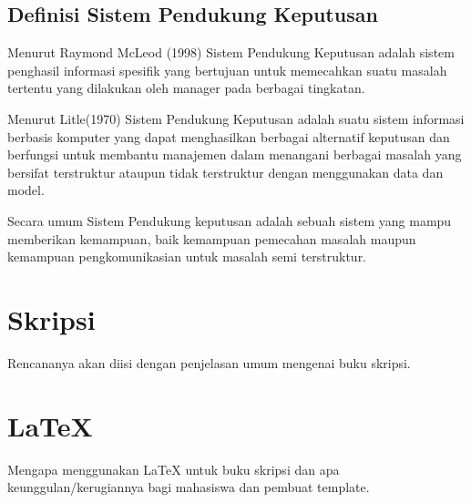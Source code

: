 \subsection{Definisi Sistem Pendukung Keputusan} 
Menurut Raymond McLeod (1998) Sistem Pendukung Keputusan adalah sistem penghasil informasi spesifik yang bertujuan untuk memecahkan suatu masalah tertentu yang dilakukan oleh manager pada berbagai tingkatan. 

Menurut Litle(1970) Sistem Pendukung Keputusan adalah suatu sistem informasi berbasis komputer yang dapat menghasilkan berbagai alternatif keputusan dan berfungsi untuk membantu manajemen dalam menangani berbagai masalah yang bersifat terstruktur ataupun tidak terstruktur dengan menggunakan data dan model.

Secara umum Sistem Pendukung keputusan adalah sebuah sistem yang mampu memberikan kemampuan, baik kemampuan pemecahan masalah maupun kemampuan pengkomunikasian untuk masalah semi terstruktur.



	








































\section{Skripsi}
\label{sec:skripsi} 
 
Rencananya akan diisi dengan penjelasan umum mengenai buku skripsi.


\section{\LaTeX}
\label{sec:latex}

Mengapa menggunakan \LaTeX{} untuk buku skripsi dan apa keunggulan/kerugiannya bagi mahasiswa dan pembuat template. 

